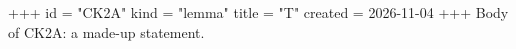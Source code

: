 +++
id = "CK2A"
kind = "lemma"
title = "T"
created = 2026-11-04
+++
Body of CK2A: a made-up statement.
